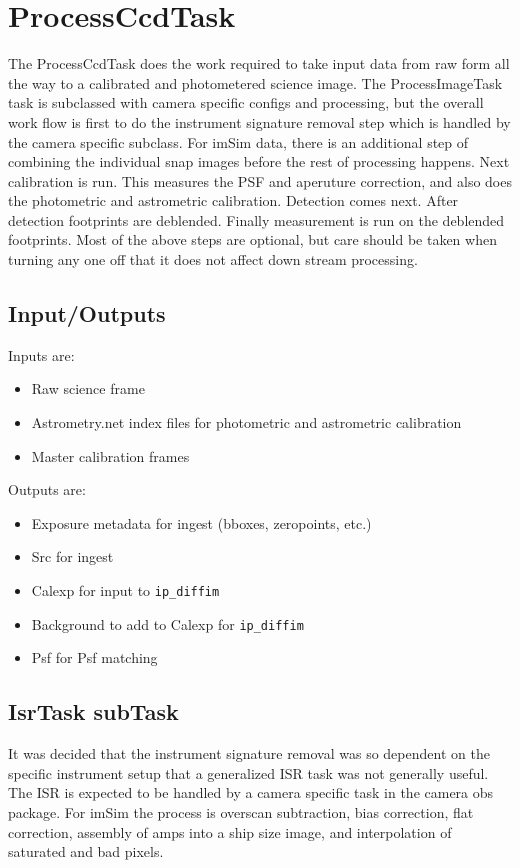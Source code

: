 \documentclass[12pt]{article}
\begin{document}
\section{ProcessCcdTask\label{processccdsec}} 
The ProcessCcdTask does the work required to take input data from raw form all the way to a calibrated and
photometered science image.  The ProcessImageTask task is subclassed with camera specific configs and processing, but the overall 
work flow is first to do the instrument signature removal step which is handled by the camera specific subclass.  For imSim
data, there is an additional step of combining the individual snap images before the rest of processing happens. Next calibration
is run.  This measures the PSF and aperuture correction, and also does the photometric and astrometric calibration.  
Detection comes next.  After detection footprints are deblended.
Finally measurement is run on the deblended footprints.  Most of the above steps are optional, but care should be taken
when turning any one off that it does not affect down stream processing.

\subsection{Input/Outputs}
Inputs are:
\begin{itemize}
\item Raw science frame
\item Astrometry.net index files for photometric and astrometric calibration
\item Master calibration frames
\end{itemize}

Outputs are:
\begin{itemize}
\item Exposure metadata for ingest (bboxes, zeropoints, etc.)
\item Src for ingest
\item Calexp for input to {\tt ip\_diffim}
\item Background to add to Calexp for {\tt ip\_diffim}
\item Psf for Psf matching
\end{itemize}

\subsection{IsrTask subTask}
It was decided that the instrument signature removal was so dependent on the specific instrument setup that a generalized
ISR task was not generally useful.  The ISR is expected to be handled by a camera specific task in the camera obs package.  
For imSim the process is overscan subtraction, bias correction, flat correction, assembly of amps into a ship size image, 
and interpolation of saturated and bad pixels.
\end{document}
